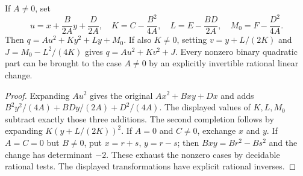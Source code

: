 \begin{lemma}\label{con:completion}
If $A\ne0$, set
\[
 u=x+\frac{B}{2A}y+\frac{D}{2A},\quad
 K=C-\frac{B^2}{4A},\quad
 L=E-\frac{BD}{2A},\quad M_0=F-\frac{D^2}{4A}.
\]
Then $q=Au^2+Ky^2+Ly+M_0$. If also $K\ne0$, setting
$v=y+L/(2K)$ and $J=M_0-L^2/(4K)$ gives $q=Au^2+Kv^2+J$.
Every nonzero binary quadratic part can be brought to the case $A\ne0$
by an explicitly invertible rational linear change.
\end{lemma}
\begin{proof}
Expanding $Au^2$ gives the original $Ax^2+Bxy+Dx$ and adds
$B^2y^2/(4A)+BDy/(2A)+D^2/(4A)$. The displayed values of $K,L,M_0$
subtract exactly those three additions. The second completion follows
by expanding $K(y+L/(2K))^2$.
If $A=0$ and $C\ne0$, exchange $x$ and $y$. If $A=C=0$ but $B\ne0$,
put $x=r+s$, $y=r-s$; then $Bxy=B r^2-Bs^2$ and the change has
determinant $-2$. These exhaust the nonzero cases by decidable rational
tests. The displayed transformations have explicit rational inverses.
\end{proof}

